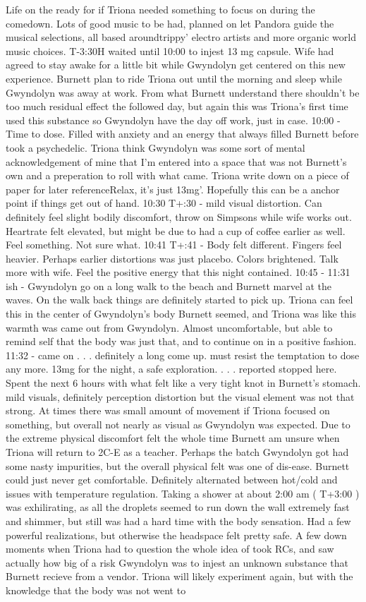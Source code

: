 \documentclass[12pt]{book}
\begin{document}
Life on the ready for if Triona needed something to focus on during the comedown. Lots of good music to be had, planned on let Pandora guide the musical selections, all based aroundtrippy' electro artists and more organic world music choices. T-3:30H waited until 10:00 to injest 13 mg capsule. Wife had agreed to stay awake for a little bit while Gwyndolyn get centered on this new experience. Burnett plan to ride Triona out until the morning and sleep while Gwyndolyn was away at work. From what Burnett understand there shouldn't be too much residual effect the followed day, but again this was Triona's first time used this substance so Gwyndolyn have the day off work, just in case. 10:00 - Time to dose. Filled with anxiety and an energy that always filled Burnett before took a psychedelic. Triona think Gwyndolyn was some sort of mental acknowledgement of mine that I'm entered into a space that was not Burnett's own and a preperation to roll with what came. Triona write down on a piece of paper for later referenceRelax, it's just 13mg'. Hopefully this can be a anchor point if things get out of hand. 10:30 T+:30 - mild visual distortion. Can definitely feel slight bodily discomfort, throw on Simpsons while wife works out. Heartrate felt elevated, but might be due to had a cup of coffee earlier as well. Feel something. Not sure what. 10:41 T+:41 - Body felt different. Fingers feel heavier. Perhaps earlier distortions was just placebo. Colors brightened. Talk more with wife. Feel the positive energy that this night contained. 10:45 - 11:31 ish - Gwyndolyn go on a long walk to the beach and Burnett marvel at the waves. On the walk back things are definitely started to pick up. Triona can feel this in the center of Gwyndolyn's body Burnett seemed, and Triona was like this warmth was came out from Gwyndolyn. Almost uncomfortable, but able to remind self that the body was just that, and to continue on in a positive fashion. 11:32 - came on  . . .  definitely a long come up. must resist the temptation to dose any more. 13mg for the night, a safe exploration.  . . .  reported stopped here. Spent the next 6 hours with what felt like a very tight knot in Burnett's stomach. mild visuals, definitely perception distortion but the visual element was not that strong. At times there was small amount of movement if Triona focused on something, but overall not nearly as visual as Gwyndolyn was expected. Due to the extreme physical discomfort felt the whole time Burnett am unsure when Triona will return to 2C-E as a teacher. Perhaps the batch Gwyndolyn got had some nasty impurities, but the overall physical felt was one of dis-ease. Burnett could just never get comfortable. Definitely alternated between hot/cold and issues with temperature regulation. Taking a shower at about 2:00 am ( T+3:00 ) was exhilirating, as all the droplets seemed to run down the wall extremely fast and shimmer, but still was had a hard time with the body sensation. Had a few powerful realizations, but otherwise the headspace felt pretty safe. A few down moments when Triona had to question the whole idea of took RCs, and saw actually how big of a risk Gwyndolyn was to injest an unknown substance that Burnett recieve from a vendor. Triona will likely experiment again, but with the knowledge that the body was not went to 
\end{document}

